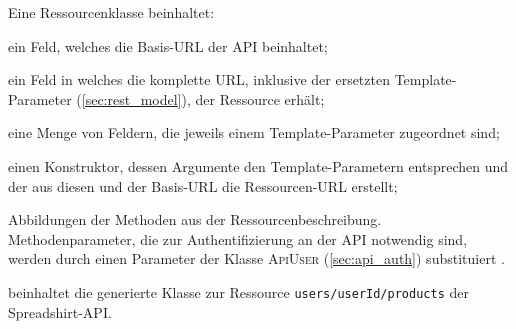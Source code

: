 Eine Ressourcenklasse beinhaltet:
\begin{compactitem}
    \item[\ding{202}] ein Feld, welches die Basis-\gls{URL} der API beinhaltet;
    \item[\ding{203}] ein Feld in welches die komplette \gls{URL}, inklusive der ersetzten Template-Parameter (\cref{sec:rest_model}), der Ressource erhält;
    \item[\ding{204}] eine Menge von Feldern, die jeweils einem Template-Parameter zugeordnet sind;
    \item[\ding{205}] einen Konstruktor, dessen Argumente den Template-Parametern entsprechen und der aus diesen und der Basis-\gls{URL} die Ressourcen-\gls{URL} erstellt;
    \item[\ding{206}] Abbildungen der Methoden aus der Ressourcenbeschreibung. Methodenparameter, die zur Authentifizierung an der \gls{API} notwendig sind, werden durch einen Parameter der Klasse \textsc{ApiUser} (\cref{sec:api_auth}) substituiert .
\end{compactitem}

 beinhaltet die generierte Klasse zur Ressource \texttt{users/{userId}/products} der Spreadshirt-\gls{API}.

\newpage

